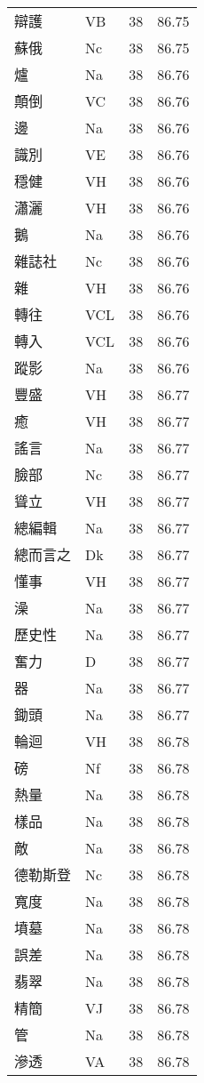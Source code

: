 \documentclass[twocolumn]{book}
\begin{document}
\begin{supertabular}{llrr}
辯護 & VB & 38 &  86.75\\
蘇俄 & Nc & 38 &  86.75\\
爐 & Na & 38 &  86.76\\
顛倒 & VC & 38 &  86.76\\
邊 & Na & 38 &  86.76\\
識別 & VE & 38 &  86.76\\
穩健 & VH & 38 &  86.76\\
瀟灑 & VH & 38 &  86.76\\
鵝 & Na & 38 &  86.76\\
雜誌社 & Nc & 38 &  86.76\\
雜 & VH & 38 &  86.76\\
轉往 & VCL & 38 &  86.76\\
轉入 & VCL & 38 &  86.76\\
蹤影 & Na & 38 &  86.76\\
豐盛 & VH & 38 &  86.77\\
癒 & VH & 38 &  86.77\\
謠言 & Na & 38 &  86.77\\
臉部 & Nc & 38 &  86.77\\
聳立 & VH & 38 &  86.77\\
總編輯 & Na & 38 &  86.77\\
總而言之 & Dk & 38 &  86.77\\
懂事 & VH & 38 &  86.77\\
澡 & Na & 38 &  86.77\\
歷史性 & Na & 38 &  86.77\\
奮力 & D & 38 &  86.77\\
器 & Na & 38 &  86.77\\
鋤頭 & Na & 38 &  86.77\\
輪迴 & VH & 38 &  86.78\\
磅 & Nf & 38 &  86.78\\
熱量 & Na & 38 &  86.78\\
樣品 & Na & 38 &  86.78\\
敵 & Na & 38 &  86.78\\
德勒斯登 & Nc & 38 &  86.78\\
寬度 & Na & 38 &  86.78\\
墳墓 & Na & 38 &  86.78\\
誤差 & Na & 38 &  86.78\\
翡翠 & Na & 38 &  86.78\\
精簡 & VJ & 38 &  86.78\\
管 & Na & 38 &  86.78\\
滲透 & VA & 38 &  86.78\\

\end{supertabular}
\end{document}
